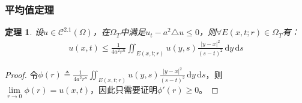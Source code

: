 \documentclass[11pt, a4paper]{article}
\theoremstyle{theorem}
\newtheorem{thm}{定理}[section]
\newcommand{\intd}[1]{\,\mathrm{d}{#1}}
\begin{document}
\subsubsection{平均值定理}

\begin{thm}
\label{thm-average}
设$u \in \mathcal{C}^{2.1}(\Omega)$，在$\Omega_T$中满足$u_t - a^2 \triangle u \leq 0$，则$\forall E(x,t;r) \in \Omega_T$有：
\begin{align}
\label{equa4-8-1}
    u(x,t) \leq \frac{1}{4a^2 r^n} \iint_{E(x,t;r)} u(y,s) \frac{|y - x|^2}{(s-t)^2} \intd y \intd s
\end{align}
\end{thm}

\begin{proof}
  令$\phi(r) \triangleq \frac{1}{4a^2 r^n} \iint_{E(x,t;r)} u(y,s) \frac{|y - x|^2}{(s-t)^2} \intd y \intd s$，则$\lim\limits_{r \rightarrow 0}\phi(r) = u(x,t)$，因此只需要证明$\phi'(r) \geq 0$。


\end{proof}
\end{document}
